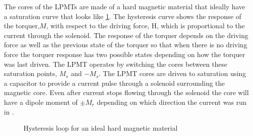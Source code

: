 The cores of the \acp{LPMT} are made of a hard magnetic material that ideally have a saturation curve that looks like \cref{fig:histlpmt}. The hysteresis curve shows the response of the torquer,$M$, with respect to the driving force, H, which is proportional to the current through the solenoid. The response of the torquer depends on the driving force as well as the previous state of the torquer so that when there is no driving force the torquer response has two possible states depending on how the torquer was last driven. The \ac{LPMT} operates by switching the cores between these saturation points, $M_s$ and $-M_s$. The \ac{LPMT} cores are driven to saturation using a capacitor to provide a current pulse through a solenoid surrounding the magnetic core. Even after current stops flowing through the solenoid the core will have a dipole moment of $\pm M_r$ depending on which direction the current was run in \cite{Mentch11}.

\begin{figure}[H]
    \centering
    \caption{Hysteresis loop for an ideal hard magnetic material}
    \label{fig:histlpmt}
\end{figure}


